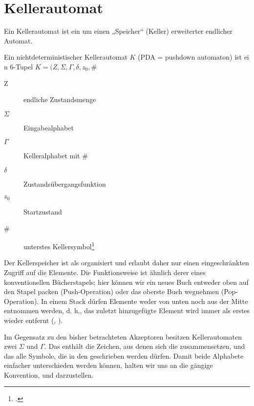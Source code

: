 \documentclass{lehramt-informatik-haupt}
\begin{document}

%

\section{Kellerautomat}

Ein Kellerautomat ist ein um einen „Speicher“ (Keller) erweiterter
endlicher Automat.

Ein nichtdeterministischer Kellerautomat $K$ (PDA = pushdown automaton)
ist ei n 6-Tupel $K = (Z, \Sigma, \Gamma, \delta, z_0 , \#$

\begin{description}
\item[Z] endliche Zustandsmenge
\item[$\Sigma$] Eingabealphabet
\item[$\Gamma$] Kelleralphabet mit \#
\item[$\delta$] Zustandsübergangsfunktion
\item[$z_0$] Startzustand
\item[\#] unterstes Kellersymbol\footcite[Seite 22]{theo:fs:2}
\end{description}

Der Kellerspeicher ist als  organisiert und
erlaubt daher nur einen eingeschränkten Zugriff auf die Elemente. Die
Funktionsweise ist ähnlich derer eines konventionellen Bücherstapels;
hier können wir ein neues Buch entweder oben auf den Stapel packen
(Push-Operation) oder das oberste Buch wegnehmen (Pop-Operation). In
einem Stack dürfen Elemente weder von unten noch aus der Mitte entnommen
werden, d. h., das zuletzt hinzugefügte Element wird immer als erstes
wieder entfernt (, ).

Im Gegensatz zu den bisher betrachteten Akzeptoren besitzen
Kellerautomaten zwei  $\Sigma$ und
$\Gamma$. Das  enthält die Zeichen, aus
denen sich die  zusammensetzen, und das
 alle Symbole, die in den
 geschrieben werden dürfen. Damit beide Alphabete
einfacher unterschieden werden können, halten wir uns an die gängige
Konvention,  und
 darzustellen.
\end{document}
